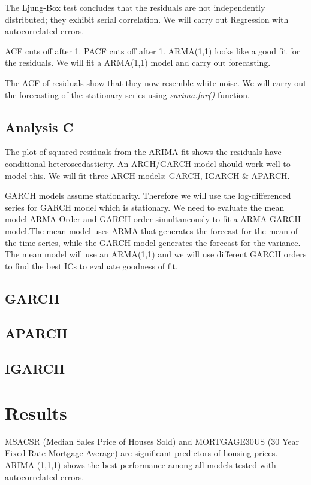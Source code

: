 \documentclass[
  man]{apa6}
\begin{document}
The Ljung-Box test concludes that the residuals are not independently distributed; they exhibit serial correlation. We will carry out Regression with autocorrelated errors.

ACF cuts off after 1. PACF cuts off after 1. ARMA(1,1) looks like a good fit for the residuals. We will fit a ARMA(1,1) model and carry out forecasting.

The ACF of residuals show that they now resemble white noise. We will carry out the forecasting of the stationary series using \emph{sarima.for()} function.

\subsection{Analysis C}\label{analysis-c}

The plot of squared residuals from the ARIMA fit shows the residuals have conditional heteroscedasticity. An ARCH/GARCH model should work well to model this. We will fit three ARCH models: GARCH, IGARCH \& APARCH.

GARCH models assume stationarity. Therefore we will use the log-differenced series for GARCH model which is stationary. We need to evaluate the mean model ARMA Order and GARCH order simultaneously to fit a ARMA-GARCH model.The mean model uses ARMA that generates the forecast for the mean of the time series, while the GARCH model generates the forecast for the variance. The mean model will use an ARMA(1,1) and we will use different GARCH orders to find the best ICs to evaluate goodness of fit.

\subsection{GARCH}\label{garch}

\subsection{APARCH}\label{aparch}

\subsection{IGARCH}\label{igarch}

\section{Results}\label{results}

MSACSR (Median Sales Price of Houses Sold) and MORTGAGE30US (30 Year Fixed Rate Mortgage Average) are significant predictors of housing prices. ARIMA (1,1,1) shows the best performance among all models tested with autocorrelated errors.
\end{document}
